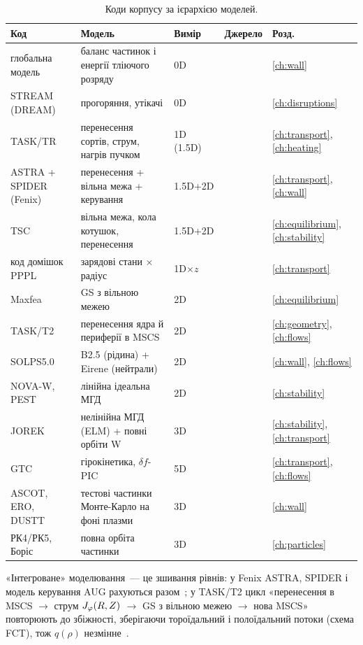 \begin{table}[htbp]\centering\footnotesize
\caption{Коди корпусу за ієрархією моделей.}\label{tab:11-codes}
\begin{tabularx}{\textwidth}{@{}l X l l l@{}}
\toprule
Код & Модель & Вимір & Джерело & Розд. \\
\midrule
глобальна модель & баланс частинок і енергії тліючого розряду & 0D & \cite{Martsenyuk2025} & \ref{ch:wall}\\
STREAM (DREAM) & прогоряння, утікачі & 0D & \cite{Hoppe2022} & \ref{ch:disruptions}\\
TASK/TR & перенесення сортів, струм, нагрів пучком & 1D (1.5D) & \cite{Fukuyama1992} & \ref{ch:transport}, \ref{ch:heating}\\
ASTRA + SPIDER (Fenix) & перенесення + вільна межа + керування & 1.5D+2D & \cite{Fable2022} & \ref{ch:transport}, \ref{ch:wall}\\
TSC & вільна межа, кола котушок, перенесення & 1.5D+2D & \cite{Jardin2000} & \ref{ch:equilibrium}, \ref{ch:stability}\\
код домішок PPPL & зарядові стани $\times$ радіус & 1D$\times z$ & \cite{Hulse1992} & \ref{ch:transport}\\
Maxfea & GS з вільною межею & 2D & \cite{Merlo2011} & \ref{ch:equilibrium}\\
TASK/T2 & перенесення ядра й периферії в MSCS & 2D & \cite{Seto2014} & \ref{ch:geometry}, \ref{ch:flows}\\
SOLPS5.0 & B2.5 (рідина) + Eirene (нейтрали) & 2D & \cite{AhoMantila2011} & \ref{ch:wall}, \ref{ch:flows}\\
NOVA-W, PEST & лінійна ідеальна МГД & 2D & \cite{Ward1992,Hanada1990} & \ref{ch:stability}\\
JOREK & нелінійна МГД (ELM) + повні орбіти W & 3D & \cite{vanVugt2019} & \ref{ch:stability}, \ref{ch:transport}\\
GTC & гірокінетика, $\delta f$-PIC & 5D & \cite{Wang2006} & \ref{ch:transport}, \ref{ch:flows}\\
ASCOT, ERO, DUSTT & тестові частинки Монте-Карло на фоні плазми & 3D & \cite{AhoMantila2011,Pigarov2006} & \ref{ch:wall}\\
РК4/РК5, Боріс & повна орбіта частинки & 3D & \cite{Moskvitina2010,vanVugt2019} & \ref{ch:particles}\\
\bottomrule
\end{tabularx}
\end{table}

«Інтегроване» моделювання~--- це зшивання рівнів: у Fenix ASTRA, SPIDER і модель керування AUG рахуються разом~\cite{Fable2022}; у TASK/T2 цикл «перенесення в MSCS $\to$ струм $J_{\varphi}(R,Z)$ $\to$ GS з вільною межею $\to$ нова MSCS» повторюють до збіжності, зберігаючи тороїдальний і полоїдальний потоки (схема FCT), тож $q(\rho)$ незмінне~\cite[с.~8--9]{Seto2014}.

